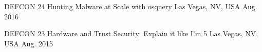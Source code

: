 \begin{cvhonors}

\cvhonor
{DEFCON 24} %
{Hunting Malware at Scale with osquery} %
{Las Vegas, NV, USA} %
{Aug. 2016} %


\cvhonor
{DEFCON 23} %
{Hardware and Trust Security: Explain it like I’m 5} %
{Las Vegas, NV, USA} %
{Aug. 2015} %


\end{cvhonors}
